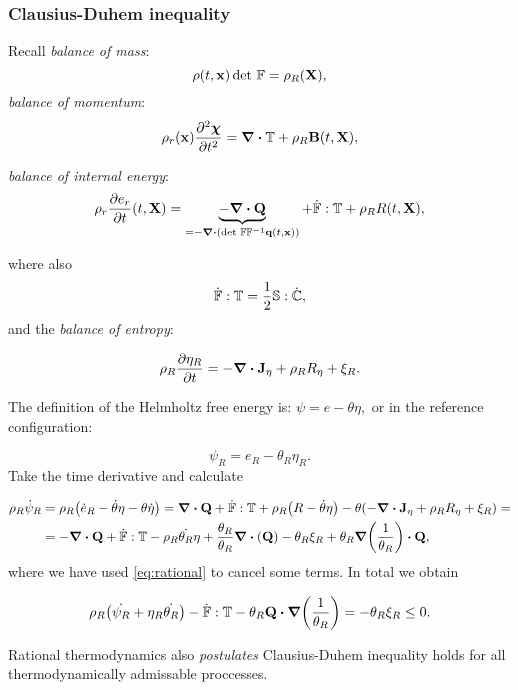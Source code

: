 \documentclass[reqno, a4paper]{article}
\begin{document}
\subsubsection{Clausius-Duhem inequality}
\label{sec:clausius}

Recall \textit{balance of mass}:
\[
	\rho \qty(t,\vb{x}) \det\, \mathbb{F} = \rho_{R}\qty(\vb{X}),
\]
\textit{balance of momentum}:
\[
	\rho_r\qty(\vb{x})\pdv[2]{\vb*{\chi}}{t} = \divergence{\pkstress}+ \rho_R \vb{B}\qty(t,\vb{X}),
\]

\textit{balance of internal energy}:
\[
	\rho_r \pdv{e_r}{t}\qty(t,\vb{X}) = \underbrace{- \divergence{\vb{Q}}}_{= - \divergence{\qty(\detf \inverse{\fgrad}\vb{q}\qty(t,\vb{x}))}} + \dot{\fgrad}: \pkstress + \rho_R R\qty(t,\vb{X}),
\]

where also
\[
	\dot{\mathbb{F}}:\mathbb{T} = \frac{1}{2}\mathbb{S}: \dot{\mathbb{C}},
\]
and the \textit{balance of entropy}:

\[
	\rho_R \pdv{\eta_R}{t} = -\divergence{\vb{J}_{\eta}}+\rho_R R_{\eta} + \xi_R.
\]

The definition of the Helmholtz free energy is: $\psi = e - \theta \eta,$ or in the reference configuration:

\[
	\psi_R = e_R - \theta_R \eta_R.
\]
Take the time derivative and calculate 

\begin{align*}
	\rho_R \dot{\psi}_R &= \rho_R\qty(\dot{e}_R - \dot{\theta}\eta - \theta \dot{\eta}) = \divergence{\vb{Q}} + \dot{\fgrad} : \pkstress + \rho_R \qty(R - \dot{\theta} \eta) - \theta\qty(-\divergence{\vb{J}_{\eta}}+\rho_R R_{\eta}+\xi_R) = \\
			    & = - \divergence{\vb{Q}}+\dot{\fgrad} : \pkstress - \rho_{R} \dot{\theta_R}\eta + \frac{\theta_R}{\theta_R}\divergence{\qty(\vb{Q})} - \theta_R \xi_R +  \theta_R \grad\qty(\frac{1}{\theta_R})\vdot\vb{Q},
\end{align*}
where we have used \ref{eq:rational} to cancel some terms. In total we obtain

\begin{tcolorbox}
\begin{equation}
	\label{eq:clausis_duhem}
	\rho_R\qty(\dot{\psi_R}+ \eta_R \dot{\theta_R}) - \dot{\fgrad}: \pkstress - \theta_R \vb{Q}\vdot \grad\qty(\frac{1}{\theta_R})	= -\theta_R \xi_R \leq 0.
\end{equation}
\end{tcolorbox}

Rational thermodynamics also \textit{postulates} Clausius-Duhem inequality holds for all thermodynamically admissable proccesses.
\end{document}
